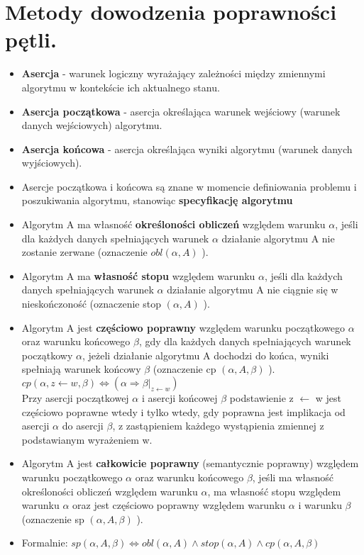 \documentclass[main.tex]{subfiles}
\begin{document}
    \section{Metody dowodzenia poprawności pętli.}

    \begin{itemize}
        \item \textbf{Asercja} - warunek logiczny wyrażający zależności między zmiennymi
        algorytmu w kontekście ich aktualnego stanu.
        \item \textbf{Asercja początkowa} - asercja określająca warunek wejściowy (warunek danych wejściowych) algorytmu.
        \item \textbf{Asercja końcowa} - asercja określająca wyniki algorytmu (warunek
        danych wyjściowych).
        \item Asercje początkowa i końcowa są znane w momencie definiowania
        problemu i poszukiwania algorytmu, stanowiąc \textbf{specyfikację algorytmu}
    \end{itemize}

    \begin{itemize}
        \item Algorytm A ma własność \textbf{określoności obliczeń} względem warunku $\alpha$, jeśli dla każdych danych spełniających warunek $\alpha$ działanie algorytmu A nie zostanie zerwane
        (oznaczenie $obl ( \alpha, A )$ ).
        \item Algorytm A ma \textbf{własność stopu} względem warunku $\alpha$, jeśli dla każdych danych spełniających warunek $\alpha$ działanie algorytmu A nie ciągnie się w nieskończoność (oznaczenie stop $( \alpha, A )$ ).
        \item Algorytm A jest \textbf{częściowo poprawny} względem warunku początkowego $\alpha$ oraz warunku końcowego $\beta$, gdy dla każdych danych spełniających warunek początkowy $\alpha$, jeżeli działanie algorytmu A dochodzi do końca, wyniki spełniają warunek końcowy $\beta$ (oznaczenie cp $( \alpha, A, \beta)$ ).\\
        $cp ( \alpha, z \leftarrow w, \beta ) \iff ( \alpha \Rightarrow \beta|_{z \leftarrow w})$\\
        Przy asercji początkowej $\alpha$ i asercji końcowej $\beta$ podstawienie z $\leftarrow$ w jest częściowo poprawne wtedy i tylko wtedy, gdy
        poprawna jest implikacja od asercji $\alpha$ do asercji $\beta$, z zastąpieniem każdego wystąpienia zmiennej z podstawianym
        wyrażeniem w.
        \item Algorytm A jest \textbf{całkowicie poprawny} (semantycznie poprawny) względem warunku
        początkowego $\alpha$ oraz warunku końcowego $\beta$, jeśli ma własność określoności obliczeń
        względem warunku $\alpha$, ma własność stopu względem warunku $\alpha$ oraz jest częściowo
        poprawny względem warunku $\alpha$ i warunku $\beta$ (oznaczenie sp $( \alpha, A, \beta )$ ).
        \item Formalnie:
        $sp ( \alpha, A, \beta ) \iff obl ( \alpha, A ) \wedge stop ( \alpha, A ) \wedge cp ( \alpha, A, \beta )$
    \end{itemize}
\end{document}
